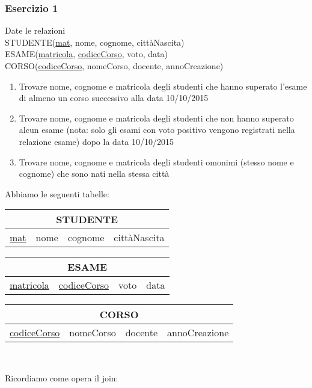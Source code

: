 \documentclass[a4paper]{article}
\begin{document}
\subsubsection{Esercizio 1}
Date le relazioni\medskip\\
STUDENTE(\underline{mat}, nome, cognome, cittàNascita)\\
ESAME(\underline{matricola}, \underline{codiceCorso}, voto, data)\\
CORSO(\underline{codiceCorso}, nomeCorso, docente, annoCreazione)\par \begin{enumerate}
  \item Trovare nome, cognome e matricola degli studenti che hanno superato l'esame di almeno un corso successivo alla data 10/10/2015
  \item Trovare nome, cognome e matricola degli studenti che non hanno superato alcun esame (nota: solo gli esami con voto positivo vengono registrati nella relazione esame) dopo la data 10/10/2015
  \item Trovare nome, cognome e matricola degli studenti omonimi (stesso nome e cognome) che sono nati nella stessa città
\end{enumerate}\par \begin{mybox}{}
  Abbiamo le seguenti tabelle:\medskip\\
  \begin{tabular}{|c|c|c|c|}
    \hline
    \multicolumn{4}{|c|}{STUDENTE}\\
    \hline
    \underline{mat} & nome & cognome & cittàNascita\\
    \hline
  \end{tabular}
\medskip\par \begin{tabular}{|c|c|c|c|}
  \hline
  \multicolumn{4}{|c|}{ESAME}\\
  \hline
  \underline{matricola} & \underline{codiceCorso} & voto & data\\
  \hline
\end{tabular}
\medskip\par \begin{tabular}{|c|c|c|c|}
  \hline
  \multicolumn{4}{|c|}{CORSO}\\
  \hline
  \underline{codiceCorso} & nomeCorso & docente & annoCreazione\\
  \hline
\end{tabular}
\medskip\medskip\\\par Ricordiamo come opera il join:\medskip\\

\end{mybox}
\end{document}

